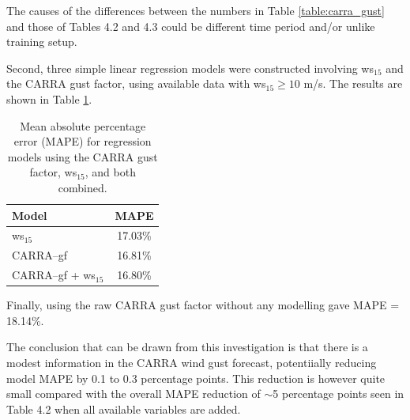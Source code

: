 The causes of the differences between the numbers in Table \ref{table:carra_gust} and those of Tables 4.2 and 4.3 could be different time period and/or unlike training setup.

Second, three simple linear regression models were constructed involving ws$_{15}$ and the CARRA gust factor, using available data with ws$_{15} \geq 10$ m/s. The results are shown in Table \ref{table:carra_gust_regression}.

\begin{table}[h]
  \centering
  \caption[Regression MAPE with and without CARRA gust factor]{Mean absolute percentage error (MAPE) for regression models using the CARRA gust factor, ws$_{15}$, and both combined.}
  \label{table:carra_gust_regression}
  \begin{tabular}{lc}
    \toprule
    Model                         & MAPE   \\
    \midrule
    ws$_{15}$                     & 17.03\% \\
    CARRA–gf                      & 16.81\% \\
    CARRA–gf + ws$_{15}$          & 16.80\% \\
    \bottomrule
  \end{tabular}
\end{table}

Finally, using the raw CARRA gust factor without any modelling gave MAPE = 18.14\%.

The conclusion that can be drawn from this investigation is that there is a modest information in the CARRA wind gust forecast, potentiially reducing model MAPE by 0.1 to 0.3 percentage points. This reduction is however quite small compared with the overall MAPE reduction of $\sim$5 percentage points seen in Table 4.2 when all available variables are added.
